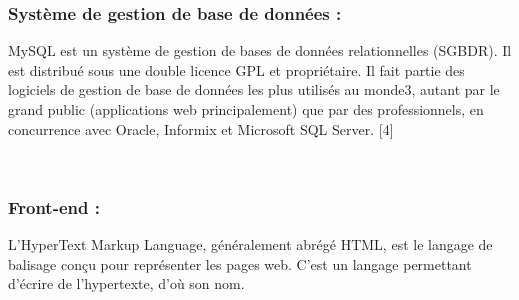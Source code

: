 \documentclass{article}
\begin{document}
{\subsubsection{Système de gestion de base de données : }
\begin{minipage}{0.12\textwidth}
	\begin{minipage}{\linewidth}
	\end{minipage}
\end{minipage}
\hfill
\begin{minipage}{0.75\textwidth}
\vspace{0.5cm}
	MySQL est un système de gestion de bases de données relationnelles (SGBDR). Il est distribué sous une
double licence GPL et propriétaire. Il fait partie des logiciels de gestion de base de données les plus utilisés
au monde3, autant par le grand public (applications web principalement) que par des professionnels, en
concurrence avec Oracle, Informix et Microsoft SQL Server. [4]
\\
\end{minipage}\\
\subsubsection{Front-end : }
\vspace{0.7cm}
\begin{minipage}{0.12\textwidth}
	\begin{minipage}{\linewidth}
	\end{minipage}
\end{minipage}
\hfill
\begin{minipage}{0.75\textwidth}
\vspace{0.5cm}
	L'HyperText Markup Language, généralement abrégé HTML, est le langage de
balisage conçu pour représenter les pages web. C'est un langage permettant d'écrire
de l'hypertexte, d'où son nom.


\end{minipage}}
\end{document}
